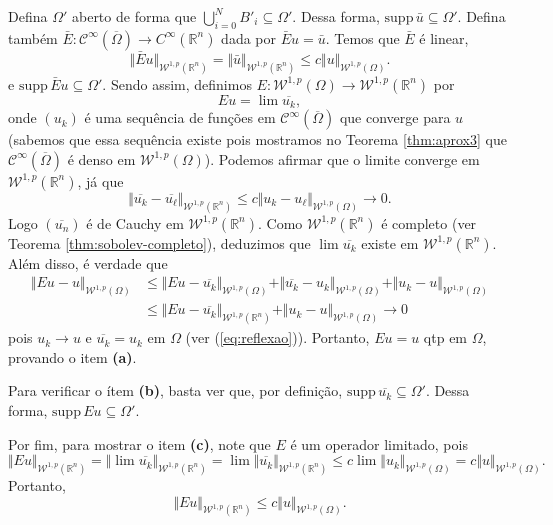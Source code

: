 \documentclass[a4paper, 11pt]{book}
\theoremstyle{definition}
\newcommand{\bR}{\mathbb{R}}
\newcommand{\cC}{\mathcal{C}}
\newcommand{\cW}{\mathcal{W}}
\newcommand{\supp}{\mathrm{supp}\,}
\begin{document}
\begin{prf}
    Defina $\Omega'$ aberto de forma que $\bigcup_{i=0}^N B'_i \subseteq \Omega'$.
    Dessa forma, $\supp \bar u \subseteq \Omega'$.
    Defina também $\bar E: \cC^\infty(\overline\Omega) \to C^\infty(\bR^n)$ dada por $\bar E u = \bar u$.
    Temos que $\bar E$ é linear,
    \[
        \Vert \bar E u \Vert_{\cW^{1,p}(\bR^n)} = \Vert \bar u \Vert_{\cW^{1,p}(\bR^n)} \leqslant c \Vert u \Vert_{\cW^{1,p}(\Omega)}.
    \]
    e $\supp \bar E u \subseteq \Omega'.$
    Sendo assim, definimos $E : \cW^{1,p}(\Omega) \to \cW^{1,p}(\bR^n)$ por
    \[
        Eu = \lim \overline{u_k},
    \]
    onde $(u_k)$ é uma sequência de funções em $\cC^\infty(\overline\Omega)$ que converge para $u$ (sabemos que essa sequência existe pois mostramos no Teorema \ref{thm:aprox3} que $\cC^\infty(\overline\Omega)$ é denso em $\cW^{1,p}(\Omega)$).
    Podemos afirmar que o limite converge em $\cW^{1,p}(\bR^n)$, já que
    \[
        \Vert \overline{u_k} - \overline{u_\ell} \Vert_{\cW^{1,p}(\bR^n)} \leqslant c \Vert u_k - u_\ell \Vert_{\cW^{1,p}(\Omega)} \to 0.
    \]
    Logo $(\overline{u_n})$ é de Cauchy em $\cW^{1,p}(\bR^n)$.
    Como $\cW^{1,p}(\bR^n)$ é completo (ver Teorema \ref{thm:sobolev-completo}), deduzimos que $\lim \overline{u_k}$ existe em $\cW^{1,p}(\bR^n)$.
    Além disso, é verdade que
    \[
        \begin{aligned}
            \Vert Eu - u \Vert_{\cW^{1,p}(\Omega)} &\leqslant \Vert Eu - \overline{u_k} \Vert_{\cW^{1,p}(\Omega)} + \Vert \overline{u_k} - u_k \Vert_{\cW^{1,p}(\Omega)} + \Vert u_k - u\Vert_{\cW^{1,p}(\Omega)}\\
            &\leqslant \Vert Eu - \overline{u_k} \Vert_{\cW^{1,p}(\bR^n)} + \Vert u_k - u \Vert_{\cW^{1,p}(\Omega)} \to 0
        \end{aligned}
    \]
    pois $u_k \to u$ e $\overline{u_k} = u_k$ em $\Omega$ (ver (\ref{eq:reflexao})).
    Portanto, $Eu = u$ qtp em $\Omega$, provando o item \textbf{(a)}.

    Para verificar o ítem \textbf{(b)}, basta ver que, por definição, $\supp \overline{u_k} \subseteq \Omega'$.
    Dessa forma, $\supp Eu \subseteq \Omega'$.

    Por fim, para mostrar o item \textbf{(c)}, note que $E$ é um operador limitado, pois
    \[
        \Vert Eu \Vert_{\cW^{1,p}(\bR^n)} = \Vert \lim \overline{u_k} \Vert_{\cW^{1,p}(\bR^n)} = \lim \Vert \overline{u_k} \Vert_{\cW^{1,p}(\bR^n)} \leqslant c \lim \Vert u_k \Vert_{\cW^{1,p}(\Omega)} = c \Vert u \Vert_{\cW^{1,p}(\Omega)}.
    \]
    Portanto,
    \[
        \Vert Eu \Vert_{\cW^{1,p}(\bR^n)} \leqslant c \Vert u \Vert_{\cW^{1,p}(\Omega)}.
    \]
\end{prf}
\end{document}
